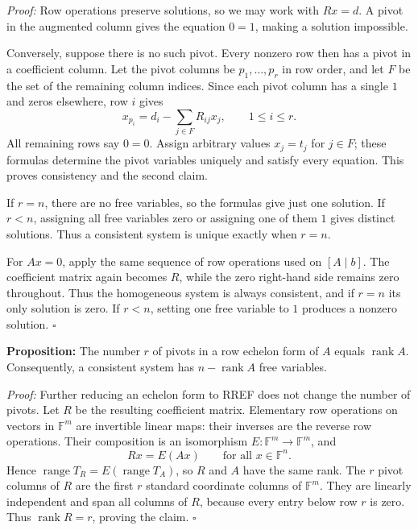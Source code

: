\documentclass[a4paper,11pt,abstract=true]{scrartcl}
\theoremstyle{dotlessP}
\theoremstyle{dotlessS}
\theoremstyle{remark}
\theoremstyle{definition}
\begin{document}
\begin{claim_box}
\textit{Proof:} Row operations preserve solutions, so we may work with
$Rx=d$. A pivot in the augmented column gives the equation $0=1$,
making a solution impossible.

Conversely, suppose there is no such pivot. Every nonzero row then
has a pivot in a coefficient column. Let the pivot columns be
$p_1,\ldots,p_r$ in row order, and let $F$ be the set of the remaining
column indices. Since each pivot column has a single $1$ and zeros
elsewhere, row $i$ gives
\[
x_{p_i}=d_i-\sum_{j\in F}R_{ij}x_j,
\qquad 1\leq i\leq r.
\]
All remaining rows say $0=0$. Assign arbitrary values $x_j=t_j$ for
$j\in F$; these formulas determine the pivot variables uniquely and
satisfy every equation. This proves consistency and the second claim.

If $r=n$, there are no free variables, so the formulas give just one
solution. If $r<n$, assigning all free variables zero or assigning
one of them $1$ gives distinct solutions. Thus a consistent system
is unique exactly when $r=n$.

For $Ax=0$, apply the same sequence of row operations used on $[A\mid b]$.
The coefficient matrix again becomes $R$, while the zero right-hand
side remains zero throughout.
Thus the homogeneous system is always consistent, and if $r=n$ its
only solution is zero. If $r<n$, setting one free variable to $1$
produces a nonzero solution. \hfill$\square$
\end{claim_box}

\begin{problem_box}
\textbf{Proposition:} The number $r$
of pivots in a row echelon form of $A$ equals $\operatorname{rank}A$.
Consequently, a consistent system has $n-\operatorname{rank}A$ free
variables.

\end{problem_box}

\begin{claim_box}
\textit{Proof:} Further reducing an echelon form to RREF does not
change the number of pivots. Let $R$ be the resulting coefficient
matrix. Elementary row operations on vectors in $\mathbb{F}^m$ are
invertible linear maps: their inverses are the reverse row operations.
Their composition is an isomorphism $E:\mathbb{F}^m\longrightarrow
\mathbb{F}^m$, and
\[
Rx=E(Ax)\qquad\text{for all }x\in\mathbb{F}^n.
\]
Hence $\operatorname{range}T_R=E(\operatorname{range}T_A)$, so $R$
and $A$ have the same rank. The $r$ pivot columns of $R$ are the first
$r$ standard coordinate columns of $\mathbb{F}^m$. They are linearly
independent and span all columns of $R$, because every entry below
row $r$ is zero. Thus $\operatorname{rank}R=r$, proving the claim.
\hfill$\square$
\end{claim_box}
\end{document}

